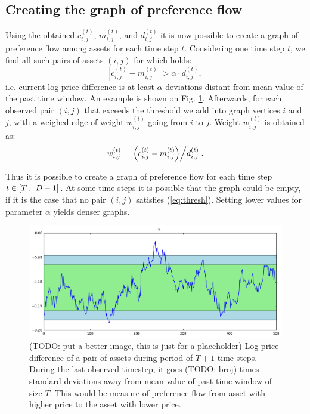 \documentclass[letterpaper, 10 pt, conference]{ieeeconf}
\newcommand{\upto}{\mathinner {\ldotp \ldotp}}
\begin{document}
  \subsection{Creating the graph of preference flow}
  \label{sub:creating-graph}
  Using the obtained $c_{i,j}^{(t)}$, $m_{i,j}^{(t)}$, and $d_{i,j}^{(t)}$ it is now possible to create a graph of preference flow among assets for each time step $t$.
  Considering one time step $t$, we find all such pairs of assets $(i,j)$ for which holds:  
  \begin{equation}
    \label{eq:thresh}
    \left| c_{i,j}^{(t)} - m_{i,j}^{(t)} \right| > \alpha \cdot d_{i,j}^{(t)},
  \end{equation}
  i.e. current log price difference is at least $\alpha$ deviations distant from mean value of the past time window.
  An example is shown on Fig. \ref{fig:devmag}.
  Afterwards, for each observed pair $(i,j)$ that exceeds the threshold we add into graph vertices $i$ and $j$, with a weighed edge of weight $w_{i,j}^{(t)}$ going from $i$ to $j$.
  Weight $w_{i,j}^{(t)}$ is obtained as:
  \begin{equation}
    \label{eq:weight}
    w_{i,j}^{(t)} = \left. \left(c_{i,j}^{(t)} - m_{i,j}^{(t)}\right) \middle/ d_{i,j}^{(t)} \right..
  \end{equation}
  
  Thus it is possible to create a graph of preference flow for each time step $t \in \left[T \upto D-1\right]$.
  At some time steps it is possible that the graph could be empty, if it is the case that no pair $(i,j)$ satisfies (\ref{eq:thresh}).
  Setting lower values for parameter $\alpha$ yields denser graphs.
  
  \begin{figure}[h]
    \centering
    \includegraphics[width=0.9\columnwidth]{graphics/deviation-magnitude.png}
    \caption{(TODO: put a better image, this is just for a placeholder) Log price difference of a pair of assets during period of $T + 1$ time steps.
      During the last observed timestep, it goes (TODO: broj) times standard deviations away from mean value of past time window of size $T$.
      This would be measure of preference flow from asset with higher price to the asset with lower price.}
    \label{fig:devmag}
  \end{figure}
  
\end{document}

